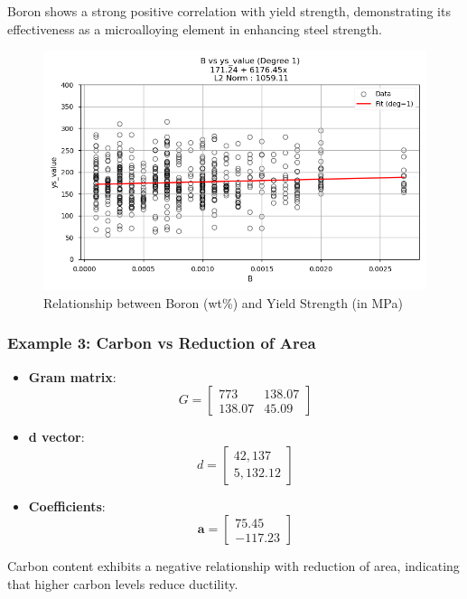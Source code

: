\documentclass[10pt]{article}
\begin{document}
Boron shows a strong positive correlation with yield strength, demonstrating its effectiveness as a microalloying element in enhancing steel strength.

\begin{figure}[H]
    \centering
    \includegraphics[width=\imagewidthone\textwidth]{figures/03_leastsq/B_vs_ys_value_deg1.png}
    \caption{Relationship between Boron (wt\%) and Yield Strength (in MPa)}
\end{figure}


\newpage
\subsubsection{Example 3: Carbon vs Reduction of Area}
\begin{itemize}
    \item \textbf{Gram matrix}:
    \[
    G = \begin{bmatrix}
    773 & 138.07 \\
    138.07 & 45.09
    \end{bmatrix}
    \]
    \item \textbf{d vector}:
    \[
    d = \begin{bmatrix}
    42,137 \\
    5,132.12
    \end{bmatrix}
    \]
    \item \textbf{Coefficients}:
    \[
    \mathbf{a} = \begin{bmatrix}
    75.45 \\
    -117.23
    \end{bmatrix}
    \]
\end{itemize}

Carbon content exhibits a negative relationship with reduction of area, indicating that higher carbon levels reduce ductility.
\end{document}
